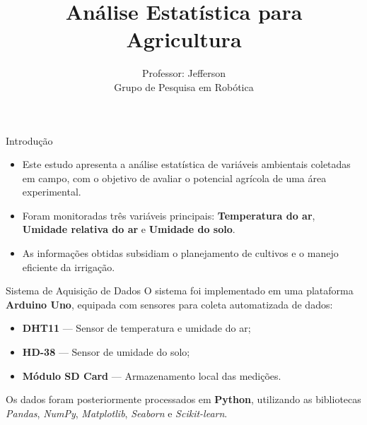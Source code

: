 \documentclass{beamer}
\title{Análise Estatística para Agricultura}
\author{
    Professor: Jefferson \\ 
    Grupo de Pesquisa em Robótica
}
\date{}
\begin{document}

\frame{\titlepage}



\begin{frame}{Introdução}
\begin{itemize}
    \item Este estudo apresenta a análise estatística de variáveis ambientais coletadas em campo, com o objetivo de avaliar o potencial agrícola de uma área experimental.
    \item Foram monitoradas três variáveis principais: \textbf{Temperatura do ar}, \textbf{Umidade relativa do ar} e \textbf{Umidade do solo}.
    \item As informações obtidas subsidiam o planejamento de cultivos e o manejo eficiente da irrigação.
\end{itemize}
\end{frame}

\begin{frame}{Sistema de Aquisição de Dados}
O sistema foi implementado em uma plataforma \textbf{Arduino Uno}, equipada com sensores para coleta automatizada de dados:
\begin{itemize}
    \item \textbf{DHT11} — Sensor de temperatura e umidade do ar;
    \item \textbf{HD-38} — Sensor de umidade do solo;
    \item \textbf{Módulo SD Card} — Armazenamento local das medições.
\end{itemize}

Os dados foram posteriormente processados em \textbf{Python}, utilizando as bibliotecas \textit{Pandas}, \textit{NumPy}, \textit{Matplotlib}, \textit{Seaborn} e \textit{Scikit-learn}.
\end{frame}
\end{document}
